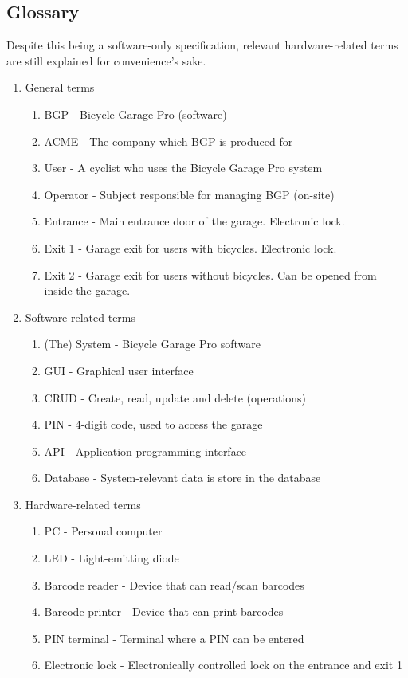 \documentclass[12pt,titlepage,bibliography=totoc]{article}
\begin{document}
\subsection{Glossary}
Despite this being a software-only specification, relevant hardware-related terms are still explained for convenience's sake.
\begin{enumerate}
	\item General terms
	\begin{enumerate}
		\item BGP - Bicycle Garage Pro (software)
		\item ACME - The company which BGP is produced for
		\item User - A cyclist who uses the Bicycle Garage Pro system
		\item Operator - Subject responsible for managing BGP (on-site)
		\item Entrance - Main entrance door of the garage. Electronic lock.
		\item Exit 1 - Garage exit for users with bicycles. Electronic lock.
		\item Exit 2 - Garage exit for users without bicycles. Can be opened from inside the garage.
	\end{enumerate}

	\item Software-related terms
	\begin{enumerate}
		\item (The) System - Bicycle Garage Pro software
		\item GUI - Graphical user interface
		\item CRUD - Create, read, update and delete (operations)
		\item PIN - 4-digit code, used to access the garage
		\item API - Application programming interface
		\item Database - System-relevant data is store in the database
	\end{enumerate}

	\item Hardware-related terms
	\begin{enumerate}
		\item PC - Personal computer
		\item LED - Light-emitting diode
		\item Barcode reader - Device that can read/scan barcodes
		\item Barcode printer - Device that can print barcodes
		\item PIN terminal - Terminal where a PIN can be entered
		\item Electronic lock - Electronically controlled lock on the entrance and exit 1
	\end{enumerate}
\end{enumerate}
\end{document}

